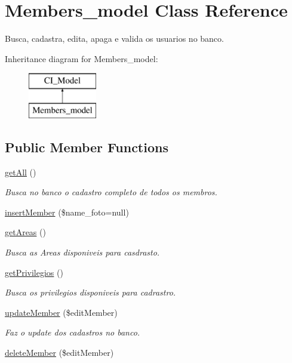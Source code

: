 \hypertarget{classMembers__model}{\section{Members\-\_\-model Class Reference}
\label{classMembers__model}
}


Busca, cadastra, edita, apaga e valida os usuarios no banco.  


Inheritance diagram for Members\-\_\-model\-:\begin{figure}[H]
\begin{center}
\leavevmode
\includegraphics[height=2.000000cm]{classMembers__model}
\end{center}
\end{figure}
\subsection*{Public Member Functions}
\begin{DoxyCompactItemize}
\item 
\hyperlink{classMembers__model_a3d7a3e4e993f06c4926e256d8566501f}{get\-All} ()
\begin{DoxyCompactList}\small\item\em Busca no banco o cadastro completo de todos os membros. \end{DoxyCompactList}\item 
\hyperlink{classMembers__model_aa554c3ab3c6c4bb923f25b17239fe8cf}{insert\-Member} (\$name\-\_\-foto=null)
\item 
\hyperlink{classMembers__model_abf70725e69dada91ea0141868842f999}{get\-Areas} ()
\begin{DoxyCompactList}\small\item\em Busca as Areas disponiveis para casdrasto. \end{DoxyCompactList}\item 
\hyperlink{classMembers__model_a2e6bd5ec11b61b6bc6b96f6a9a6f711c}{get\-Privilegios} ()
\begin{DoxyCompactList}\small\item\em Busca os privilegios disponiveis para cadrastro. \end{DoxyCompactList}\item 
\hypertarget{classMembers__model_a3917f787e9a90de13f9bcea64c794798}{\hyperlink{classMembers__model_a3917f787e9a90de13f9bcea64c794798}{update\-Member} (\$edit\-Member)}\label{classMembers__model_a3917f787e9a90de13f9bcea64c794798}

\begin{DoxyCompactList}\small\item\em Faz o update dos cadastros no banco. \end{DoxyCompactList}\item 
\hyperlink{classMembers__model_a7d653a5e0a3ab26a042f37d213f94efb}{delete\-Member} (\$edit\-Member)
\end{DoxyCompactItemize}


